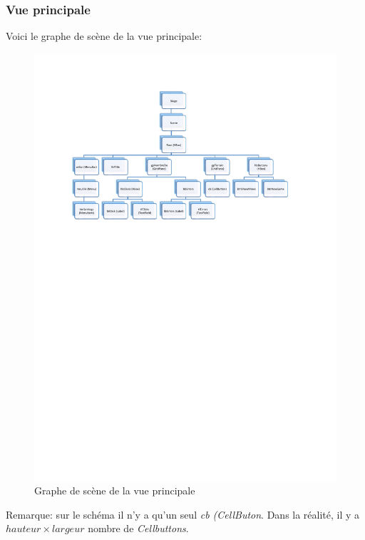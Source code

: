\documentclass[a4paper, 10pt]{article}
\begin{document}
\subsubsection{Vue principale}
Voici le graphe de scène de la vue principale:
\begin{figure}[H]
\centering
\includegraphics[width=\textwidth]{./graphe_de_scene.pdf}
\caption{Graphe de scène de la vue principale}
\end{figure}
Remarque: sur le schéma il n'y a qu'un seul \emph{cb (CellButon}. Dans la réalité, il y a $hauteur \times largeur$ nombre de \emph{Cellbuttons}.
\end{document}

